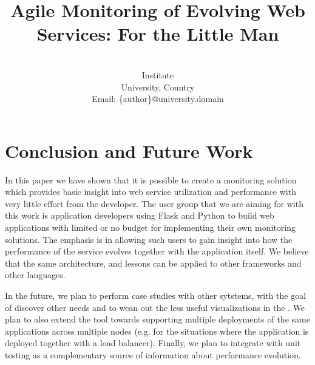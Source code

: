 \documentclass[conference]{IEEEtran}
\begin{document}
	

%
\title{Agile Monitoring of Evolving Web Services: For the Little Man}

\author{
\\
Institute\\
University, Country\\
Email: \{author\}@university.domain 
}


\maketitle
























\section{Conclusion and Future Work}
\label{sec:conclusions}


In this paper we have shown that it is possible to create a monitoring solution which provides basic insight into web service utilization and performance  with very little effort from the developer. The user group that we are aiming for with this work is application developers using Flask and Python to build web applications with limited or no budget for implementing their own monitoring solutions. The emphasis is in allowing such users to gain insight into how the performance of the service evolves together with the application itself. We believe that the same architecture, and lessons can be applied to other frameworks and other languages.

In the future, we plan to perform case studies with other sytstems, with the goal of discover other needs and to wean out the less useful visualizations in the \tool. We plan to also extend the tool towards supporting multiple deployments of the same applications across multiple nodes (e.g. for the situations where the application is deployed together with a load balancer). Finally, we plan to integrate \tool with unit testing as a complementary source of information about performance evolution.



% 







\end{document}
